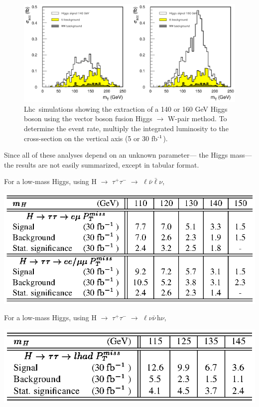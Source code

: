 \documentclass[12pt]{article}
\def\lhc{{\sc Lhc}}
\def\inv{$^{\mbox{\scriptsize -1}}$}
\begin{document}
\begin{figure}
  \begin{center}
    \includegraphics[width=\linewidth]{lhc_higgs_backgrounds.eps}
  \end{center}

  \caption{\lhc\ simulations showing the extraction of a 140 or 160
  GeV Higgs boson using the vector boson fusion Higgs $\to$ W-pair method.
  To determine the event rate, multiply the integrated luminosity to
  the cross-section on the vertical axis (5 or 30 fb\inv).}

  \label{fig:WW_backgrounds}
\end{figure}

Since all of these analyses depend on an unknown parameter--- the
Higgs mass--- the results are not easily summarized, except in tabular
format.

\pagebreak

For a low-mass Higgs, using H $\to$ $\tau^+\tau^-$ $\to$ $\ell \bar{\nu}
\bar{\ell} \nu$,
\begin{center} \includegraphics{table_lhc_low_mass1.eps} \end{center}

For a low-mass Higgs, using H $\to$ $\tau^+\tau^-$ $\to$ $\ell \nu
\bar{\nu}\,\mbox{h}\nu$,
\begin{center} \includegraphics{table_lhc_low_mass2.eps} \end{center}
\end{document}
